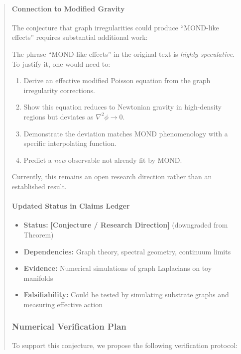 \documentclass[11pt,titlepage]{article}
\begin{document}
\begin{abstract}
\paragraph{Connection to Modified Gravity}
The conjecture that graph irregularities could produce ``MOND-like effects'' requires substantial additional work:

\begin{tcolorbox}[colback=red!5!white,colframe=red!75!black,title=Warning: Speculative Connection]
The phrase ``MOND-like effects'' in the original text is \emph{highly speculative}. To justify it, one would need to:
\begin{enumerate}
\item Derive an effective modified Poisson equation from the graph irregularity corrections.
\item Show this equation reduces to Newtonian gravity in high-density regions but deviates as $\nabla^2 \phi \to 0$.
\item Demonstrate the deviation matches MOND phenomenology with a specific interpolating function.
\item Predict a \emph{new} observable not already fit by MOND.
\end{enumerate}
Currently, this remains an open research direction rather than an established result.
\end{tcolorbox}

\paragraph{Updated Status in Claims Ledger}
\begin{itemize}
\item \textbf{Status:} \textbf{[Conjecture / Research Direction]} (downgraded from Theorem)
\item \textbf{Dependencies:} Graph theory, spectral geometry, continuum limits
\item \textbf{Evidence:} Numerical simulations of graph Laplacians on toy manifolds
\item \textbf{Falsifiability:} Could be tested by simulating substrate graphs and measuring effective action
\end{itemize}

\subsubsection{Numerical Verification Plan}
To support this conjecture, we propose the following verification protocol:


\end{abstract}
\end{document}
